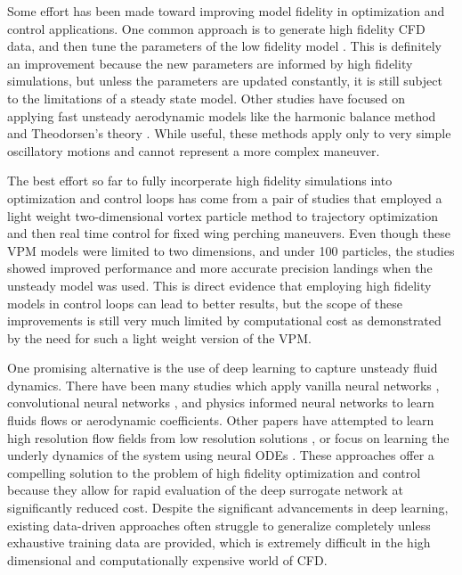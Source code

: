 \documentclass[12pt, letterpaper]{article}
\begin{document}
Some effort has been made toward improving model fidelity in optimization and control applications.  One common approach is to generate high fidelity CFD data, and then tune the parameters of the low fidelity model \cite{} \cite{} \cite{}.  This is definitely an improvement because the new parameters are informed by high fidelity simulations, but unless the parameters are updated constantly, it is still subject to the limitations of a steady state model.  Other studies have focused on applying fast unsteady aerodynamic models like the harmonic balance method \cite{} and Theodorsen's theory \cite{}.  While useful, these methods apply only to very simple oscillatory motions and cannot represent a more complex maneuver.  

The best effort so far to fully incorperate high fidelity simulations into optimization and control loops has come from a pair of studies that employed a light weight two-dimensional vortex particle method to trajectory optimization \cite{} and then real time control \cite{} for fixed wing perching maneuvers.  Even though these VPM models were limited to two dimensions, and under 100 particles, the studies showed improved performance and more accurate precision landings when the unsteady model was used.  This is direct evidence that employing high fidelity models in control loops can lead to better results, but the scope of these improvements is still very much limited by computational cost as demonstrated by the need for such a light weight version of the VPM.   

One promising alternative is the use of deep learning to capture unsteady fluid dynamics.  There have been many studies which apply vanilla neural networks \cite{} \cite{}, convolutional neural networks \cite{} \cite{}, and physics informed neural networks \cite{} \cite{} to learn fluids flows or aerodynamic coefficients.  Other papers have attempted to learn high resolution flow fields from low resolution solutions \cite{} \cite{}, or focus on learning the underly dynamics of the system using neural ODEs \cite{} \cite{}.  These approaches offer a compelling solution to the problem of high fidelity optimization and control because they allow for rapid evaluation of the deep surrogate network at significantly reduced cost.  Despite the significant advancements in deep learning, existing data-driven approaches often struggle to generalize completely unless exhaustive training data are provided, which is extremely difficult in the high dimensional and computationally expensive world of CFD. 
\end{document}

